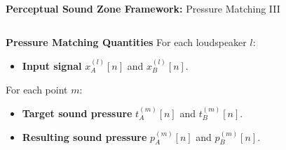 \documentclass[aspectratio=169]{beamer}
\begin{document}
\begin{frame}{\textbf{Perceptual Sound Zone Framework:} Pressure Matching III}
    \begin{columns}[c]
        \centering
        \begin{block}{\textbf{Pressure Matching Quantities}}
            For each loudspeaker $l$:
            \begin{itemize}
                \item \textbf{Input signal} $x_A^{(l)}[n]$ and $x_B^{(l)}[n]$.
                \vspace{3pt}
            \end{itemize}
            \vspace{3pt}
            For each point $m$: 
            \begin{itemize}
                \item \textbf{Target sound pressure} $t_A^{(m)}[n]$ and $t_B^{(m)}[n]$. 
                \vspace{3pt}
                \item \textbf{Resulting sound pressure} $p_A^{(m)}[n]$ and $p_B^{(m)}[n]$.
                \vspace{3pt}
            \end{itemize}
        \end{block}
        \vspace*{\fill}
        \begin{figure}[]
            \centering
            \scalebox{0.6}{}
        \end{figure}
        \vspace*{\fill}
    \end{columns}
\end{frame}
\end{document}
